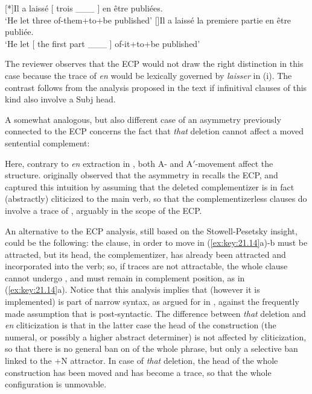 \documentclass[output=paper]{langsci/langscibook}
\begin{document}
\begin{exe}
{\begin{exe}
    [*]{Il a laissé [ trois \_\_\_ ]  en être publiées.\\
        ‘He let three of-them+to+be published’}
    []{Il a laissé la premiere partie en être publiée.\\
        ‘He let [ the first part \_\_\_ ] of-it+to+be published’}
\end{exe}
%
The reviewer observes that the \gls{ECP} would not draw the right distinction
in this case because the trace of \emph{en} would be lexically governed by
\emph{laisser} in (i). The contrast follows from the analysis proposed in the
text if infinitival clauses of this kind also involve a  Subj\tss{[+N]} head.}

A somewhat analogous, but also different case of an asymmetry previously
connected to the \gls{ECP} concerns the fact that \emph{that} deletion cannot
affect a moved sentential complement:

\ea%
    \label{ex:key:21.14}
    \z
\z
%
Here, contrary to \emph{en} extraction in , both A- and A$'$-movement
affect the structure. \citet{Stowell1981} originally observed that the
asymmetry in  recalls the \gls{ECP}, and \citet{Pesetsky1995}
captured this intuition by assuming that the deleted complementizer is in fact
(abstractly) cliticized to the main verb, so that the complementizerless
clauses do involve a trace of , arguably in the scope of the ECP.

An alternative to the \gls{ECP} analysis, still based on the Stowell-Pesetsky
insight, could be the following: the clause, in order to move in
(\ref{ex:key:21.14}a)-b must be attracted, but its head, the complementizer, has
already been attracted and incorporated into the verb; so, if traces are not
attractable, the whole clause cannot undergo , and must remain in
complement position, as in  (\ref{ex:key:21.14}a). Notice that this analysis
implies that  (however it is implemented) is part of narrow
syntax, as argued for in \citet{Roberts2010}, against the frequently made
assumption that  is post-syntactic. The difference between
\emph{that} deletion and \emph{en} cliticization is that in the latter case the
head of the construction (the numeral, or possibly a higher abstract
determiner) is not affected by cliticization, so that there is no general ban
on  of the whole phrase, but only a selective ban linked to the +N
attractor. In case of \emph{that} deletion, the head of the whole construction
has been moved and has become a trace, so that the whole configuration is
unmovable.


\end{exe}
\end{document}
